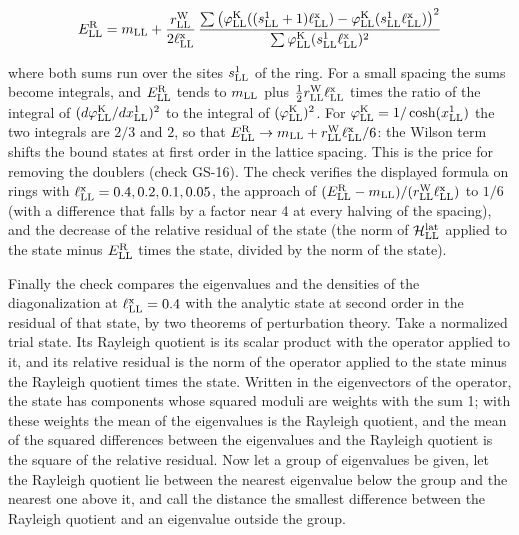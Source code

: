 \documentclass[
  10pt,
]{article}
\begin{document}
\[E^{\rm R}_{\rm LL}=m_{\rm LL}+\frac{r^{\rm W}_{\rm LL}}{2\ell^{\rm x}_{\rm LL}}\,\frac{\sum\big(\varphi^{\rm K}_{\rm LL}((s^1_{\rm LL}+1)\ell^{\rm x}_{\rm LL})-\varphi^{\rm K}_{\rm LL}(s^1_{\rm LL}\ell^{\rm x}_{\rm LL})\big)^2}{\sum\varphi^{\rm K}_{\rm LL}(s^1_{\rm LL}\ell^{\rm x}_{\rm LL})^2}\]

where both sums run over the sites \(s^1_{\rm LL}\) of the ring. For a
small spacing the sums become integrals, and \(E^{\rm R}_{\rm LL}\)
tends to \(m_{\rm LL}\) plus
\(\tfrac12r^{\rm W}_{\rm LL}\ell^{\rm x}_{\rm LL}\) times the ratio of
the integral of \((d\varphi^{\rm K}_{\rm LL}/dx^1_{\rm LL})^2\) to the
integral of \((\varphi^{\rm K}_{\rm LL})^2\). For
\(\varphi^{\rm K}_{\rm LL}=1/\cosh(x^1_{\rm LL})\) the two integrals are
\(2/3\) and \(2\), so that
\(E^{\rm R}_{\rm LL}\to m_{\rm LL}+r^{\rm W}_{\rm LL}\ell^{\rm x}_{\rm LL}/6\):
the Wilson term shifts the bound states at first order in the lattice
spacing. This is the price for removing the doublers (check GS-16). The
check verifies the displayed formula on rings with
\(\ell^{\rm x}_{\rm LL}=0.4,0.2,0.1,0.05\), the approach of
\((E^{\rm R}_{\rm LL}-m_{\rm LL})/(r^{\rm W}_{\rm LL}\ell^{\rm x}_{\rm LL})\)
to \(1/6\) (with a difference that falls by a factor near 4 at every
halving of the spacing), and the decrease of the relative residual of
the state (the norm of \(\mathcal H^{\rm lat}_{\rm LL}\) applied to the
state minus \(E^{\rm R}_{\rm LL}\) times the state, divided by the norm
of the state).

Finally the check compares the eigenvalues and the densities of the
diagonalization at \(\ell^{\rm x}_{\rm LL}=0.4\) with the analytic state
at second order in the residual of that state, by two theorems of
perturbation theory. Take a normalized trial state. Its Rayleigh
quotient is its scalar product with the operator applied to it, and its
relative residual is the norm of the operator applied to the state minus
the Rayleigh quotient times the state. Written in the eigenvectors of
the operator, the state has components whose squared moduli are weights
with the sum 1; with these weights the mean of the eigenvalues is the
Rayleigh quotient, and the mean of the squared differences between the
eigenvalues and the Rayleigh quotient is the square of the relative
residual. Now let a group of eigenvalues be given, let the Rayleigh
quotient lie between the nearest eigenvalue below the group and the
nearest one above it, and call the distance the smallest difference
between the Rayleigh quotient and an eigenvalue outside the group.
\end{document}
